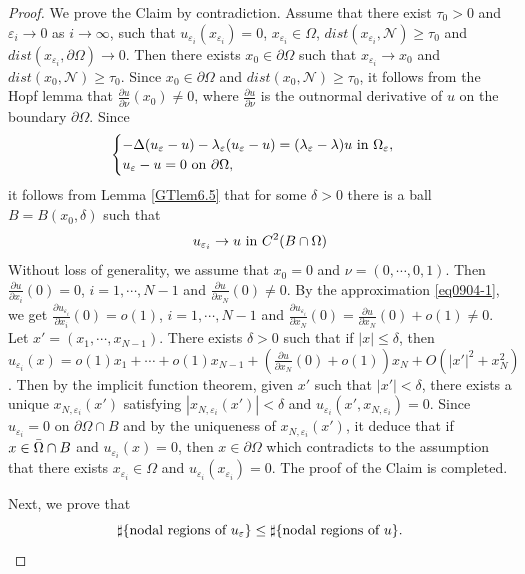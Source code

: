 \documentclass[11pt,reqno]{article}
\numberwithin{equation}{section}
\newcommand\e\varepsilon
\renewcommand\O\Omega
\begin{document}
\begin{proof}
We prove the Claim by contradiction.
    Assume that there exist $\tau_0>0$ and $\e_i\to 0$ as $i\to\infty$,   such that $u_{\e_i}(x_{\e_i})=0$, $x_{\e_i}\in \O$, $dist(x_{\e_i},\mathcal{N})\ge \tau_0$ and $dist(x_{\e_i},\partial \O)\to0$. Then there exists $x_0\in \partial\O$ such that $x_{\e_i}\to x_0$ and $dist(x_0,\mathcal{N})\ge \tau_0$. Since $x_0\in\partial\O$ and $dist(x_0,\mathcal{N})\ge \tau_0$,  it follows from the Hopf lemma that $\frac{\partial u}{\partial\nu}(x_0)\neq 0$, where $\frac{\partial u}{\partial\nu}$ is the outnormal derivative of $u$ on the boundary $\partial\O$. 
    Since 
    \begin{equation}
        \begin{cases}
            -\Delta(u_\e-u)-\lambda_\e(u_\e-u)=(\lambda_\e-\lambda)u\ \hbox{in}\ \O_\e,\\
            u_\e-u=0\ \hbox{on}\ \partial\O,\\
            \end{cases}
    \end{equation}
    it follows from Lemma \ref{GTlem6.5} that for some $\delta>0$ there is a ball $B=B(x_0,\delta)$ such that 
    \begin{equation}\label{eq0904-1}
        u_{\e_i}\to u \ \hbox{in}\ C^2(B\cap\O)
    \end{equation}
    Without loss of generality, we assume that $x_0=0$ and $\nu=(0,\cdots,0,1)$.  Then $\frac{\partial u}{\partial x_i}(0)=0$, $i=1,\cdots,N-1$ and $\frac{\partial u}{\partial x_N}(0)\neq 0$.  By the approximation \eqref{eq0904-1}, we get  $\frac{\partial u_{\e_i}}{\partial x_i}(0)=o(1)$, $i=1,\cdots,N-1$ and $\frac{\partial u_{\e_i}}{\partial x_N}(0)= \frac{\partial u}{\partial x_N}(0)+o(1)\neq 0$.  Let $x'=(x_1,\cdots,x_{N-1})$. There exists $\delta>0$ such that if  $|x|\leq \delta$, then $u_{\e_i}(x)=o(1)x_1+\cdots+o(1)x_{N-1}+\left(\frac{\partial u}{\partial x_N}(0)+o(1)\right)x_N+O(|x'|^2+x_N^2)$. Then by the implicit function theorem,  given $x'$ such that $|x'|<\delta$, there exists a unique $x_{N,\e_i}(x')$ satisfying $|x_{N,\e_i}(x')|< \delta$ and  $u_{\e_i}(x',x_{N,\e_i})=0$. Since $u_{\e_i}=0$ on $\partial\O\cap B$ and by the uniqueness of $x_{N,\e_i}(x')$, it deduce that if $x\in \Bar{\O}\cap B$ and $u_{\e_i}(x)=0$, then $x\in \partial\O$ which contradicts to the assumption that there exists $x_{\e_i}\in\O$ and $u_{\e_i}(x_{\e_i})=0$. The proof of the Claim is completed.
    

     Next, we  prove that 
    $$
    \sharp\{\hbox{nodal regions of } u_{\e}\}\leq \sharp \{\hbox{nodal regions of } u\}.
    $$
    

\end{proof}
\end{document}
